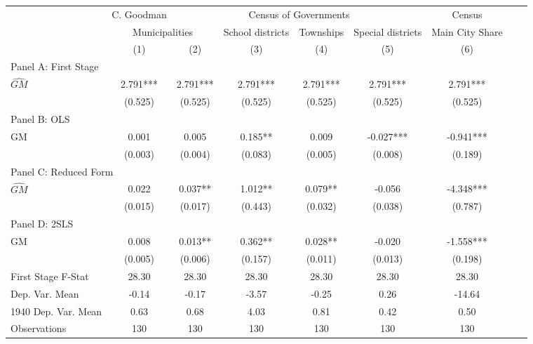  \begin{tabular}{l*{8}{c}} \toprule
&\multicolumn{1}{c}{C. Goodman}&\multicolumn{4}{c}{Census of Governments}&\multicolumn{1}{c}{Census}\\\cmidrule(lr){2-2}\cmidrule(lr){3-6}\cmidrule(lr){7-7}
&\multicolumn{2}{c}{Municipalities}&\multicolumn{1}{c}{School districts}&\multicolumn{1}{c}{Townships}&\multicolumn{1}{c}{Special districts}&\multicolumn{1}{c}{Main City Share}\\\cmidrule(lr){2-3}\cmidrule(lr){4-6}\cmidrule(lr){7-7}
&\multicolumn{1}{c}{(1)}&\multicolumn{1}{c}{(2)}&\multicolumn{1}{c}{(3)}&\multicolumn{1}{c}{(4)}&\multicolumn{1}{c}{(5)}&\multicolumn{1}{c}{(6)}\\
\cmidrule(lr){1-7}
\multicolumn{6}{l}{Panel A: First Stage}\\
\cmidrule(lr){1-7}
$\widehat{GM}$  &    2.791***&    2.791***&    2.791***&    2.791***&    2.791***&    2.791***\\
                &  (0.525)   &  (0.525)   &  (0.525)   &  (0.525)   &  (0.525)   &  (0.525)   \\
\cmidrule(lr){1-7}
\multicolumn{6}{l}{Panel B: OLS}\\
\cmidrule(lr){1-7}
GM              &    0.001   &    0.005   &    0.185** &    0.009   &   -0.027***&   -0.941***\\
                &  (0.003)   &  (0.004)   &  (0.083)   &  (0.005)   &  (0.008)   &  (0.189)   \\
\cmidrule(lr){1-7}
\multicolumn{6}{l}{Panel C: Reduced Form}\\
\cmidrule(lr){1-7}
$\widehat{GM}$  &    0.022   &    0.037** &    1.012** &    0.079** &   -0.056   &   -4.348***\\
                &  (0.015)   &  (0.017)   &  (0.443)   &  (0.032)   &  (0.038)   &  (0.787)   \\
\cmidrule(lr){1-7}
\multicolumn{6}{l}{Panel D: 2SLS}\\
\cmidrule(lr){1-7}
GM              &    0.008   &    0.013** &    0.362** &    0.028** &   -0.020   &   -1.558***\\
                &  (0.005)   &  (0.006)   &  (0.157)   &  (0.011)   &  (0.013)   &  (0.198)   \\
\midrule
First Stage F-Stat&    28.30   &    28.30   &    28.30   &    28.30   &    28.30   &    28.30   \\
Dep. Var. Mean  &    -0.14   &    -0.17   &    -3.57   &    -0.25   &     0.26   &   -14.64   \\
1940 Dep. Var. Mean&     0.63   &     0.68   &     4.03   &     0.81   &     0.42   &     0.50   \\
Observations    &      130   &      130   &      130   &      130   &      130   &      130   \\
       \bottomrule \end{tabular}
